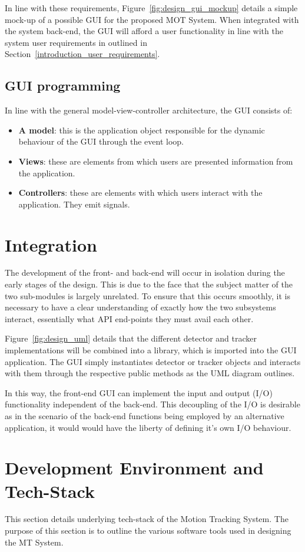 In line with these requirements, Figure~\ref{fig:design_gui_mockup} details a
simple mock-up of a possible GUI for the proposed MOT System. When integrated
with the system back-end, the GUI will afford a user functionality in
line with the system user requirements in outlined in
Section~\ref{introduction_user_requirements}.


\subsection{GUI programming}

In line with the general model-view-controller architecture, the GUI consists
of:
\begin{itemize}
    \item \textbf{A model}: this is the application object responsible for the
        dynamic behaviour of the GUI through the event loop.
    \item \textbf{Views}: these are elements from which users are presented
        information from the application. 
    \item \textbf{Controllers}: these are elements with which users interact with
        the application. They emit signals.
\end{itemize}


\section{Integration}
The development of the front- and back-end will occur in isolation during the
early stages of the design. This is due to the face that the subject matter of
the two sub-modules is largely unrelated. To ensure that this occurs smoothly,
it is necessary to have a clear understanding of exactly how the two subsystems
interact, essentially what API end-points they must avail each other.

Figure~\ref{fig:design_uml} details that the different detector and tracker
implementations will be combined into a library, which is imported into the GUI
application.
The GUI simply instantiates detector or tracker objects and interacts with them
through the respective public methods as the UML diagram outlines.

In this way, the front-end GUI can implement the input and output (I/O) functionality
independent of the back-end. This decoupling of the I/O is desirable as in the
scenario of the back-end functions being employed by an alternative application,
it would would have the liberty of defining it's own I/O behaviour. 

\section{Development Environment and Tech-Stack}
This section details underlying tech-stack of the Motion Tracking System. The
purpose of this section is to outline the various software tools used in
designing the MT System.


